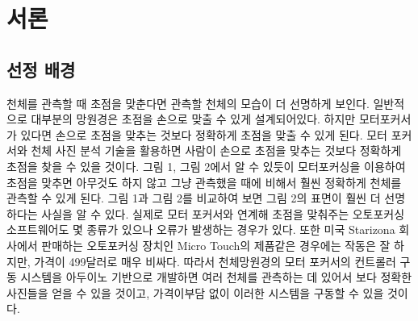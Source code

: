 \documentclass{abstract_hutech}
\begin{document}
\thispagestyle{firstpage}

\section{서론}

\subsection{선정 배경}

천체를 관측할 때 초점을 맞춘다면 관측할 천체의 모습이 더 선명하게 보인다. 일반적으로 대부분의 망원경은 초점을 손으로 맞출 수 있게 설계되어있다. 하지만 모터포커서가 있다면 손으로 초점을 맞추는 것보다 정확하게 초점을 맞출 수 있게 된다. 모터 포커서와 천체 사진 분석 기술을 활용하면 사람이 손으로 초점을 맞추는 것보다 정확하게 초점을 찾을 수 있을 것이다. 그림 1, 그림 2에서 알 수 있듯이 모터포커싱을 이용하여 초점을 맞추면 아무것도 하지 않고 그냥 관측했을 때에 비해서 훨씬 정확하게 천체를 관측할 수 있게 된다. 그림 1과 그림 2를 비교하여 보면 그림 2의 표면이 훨씬 더 선명하다는 사실을 알 수 있다. 실제로 모터 포커서와 연계해 초점을 맞춰주는 오토포커싱 소프트웨어도 몇 종류가 있으나 오류가 발생하는 경우가 있다. 또한 미국 Starizona 회사에서 판매하는 오토포커싱 장치인 Micro Touch의 제품같은 경우에는 작동은 잘 하지만, 가격이 499달러로 매우 비싸다. 따라서 천체망원경의 모터 포커서의 컨트롤러 구동 시스템을 아두이노 기반으로 개발하면 여러 천체를 관측하는 데 있어서 보다 정확한 사진들을 얻을 수 있을 것이고, 가격이부담 없이 이러한 시스템을 구동할 수 있을 것이다.
\end{document}
